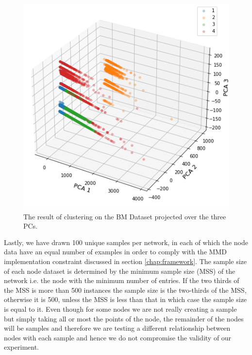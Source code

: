 \documentclass{mpaper}
\begin{document}
\begin{figure}
\centering
\begin{center}
\includegraphics[scale=0.45]{bm_clustering.png}
\end{center}
\caption{\label{fig:bm_clustering} The result of clustering on the BM Dataset projected over the three PCs.}
\end{figure}

Lastly, we have drawn 100 unique samples per network, in each of which the node data have an equal number of examples in order to comply with the MMD implementation constraint discussed in section \ref{chap:framework}. The sample size of each node dataset is determined by the minimum sample size (MSS) of the network i.e. the node with the minimum number of entries. If the two thirds of the MSS is more than 500 instances the sample size is the two-thirds of the MSS, otherwise it is 500, unless the MSS is less than that in which case the sample size is equal to it. Even though for some nodes we are not really creating a sample but simply taking all or most the points of the node, the remainder of the nodes will be samples and therefore we are testing a different relationship between nodes with each sample and hence we do not compromise the validity of our experiment.
\end{document}
